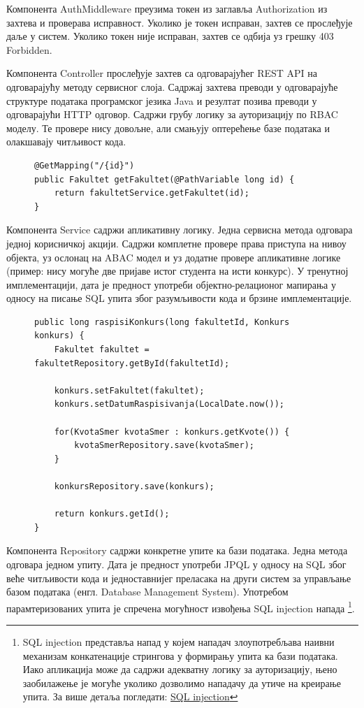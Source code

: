 \documentclass[a4paper]{article}
\begin{document}
Компонента AuthMiddleware преузима токен из заглавља Authorization из захтева и проверава исправност. Уколико је токен 
исправан, захтев се прослеђује даље у систем. Уколико токен није исправан, захтев се одбија уз грешку 403 Forbidden.

Компонента Controller прослеђује захтев са одговарајућег REST API\cite{rest} на одговарајућу методу сервисног слоја. Садржај
захтева преводи у одговарајуће структуре података програмског језика Java и резултат позива преводи у одговарајући HTTP одговор. Садржи грубу логику за ауторизацију по RBAC\cite{rbac} моделу. Те провере нису довољне, али смањују оптерећење базе података и олакшавају читљивост кода.

\begin{figure}[H]
\begin{lstlisting}[caption={Пример Controller методе},label={lst:controller},captionpos=b]
@GetMapping("/{id}")
public Fakultet getFakultet(@PathVariable long id) {
    return fakultetService.getFakultet(id);
}
\end{lstlisting}
\end{figure}

Компонента Service садржи апликативну логику. Једна сервисна метода одговара једној корисничкој акцији. Садржи комплетне
провере права приступа на нивоу објекта, уз ослонац на ABAC\cite{abac} модел и уз додатне провере апликативне логике
(пример: нису могуће две пријаве истог студента на исти конкурс). У тренутној имплементацији, дата је предност употреби
објектно-релационог мапирања у односу на писање SQL упита због разумљивости кода и брзине имплементације.

\begin{figure}[H]
\begin{lstlisting}[caption={Пример Service методе},label={lst:service},captionpos=b]
public long raspisiKonkurs(long fakultetId, Konkurs konkurs) {
    Fakultet fakultet = fakultetRepository.getById(fakultetId);

    konkurs.setFakultet(fakultet);
    konkurs.setDatumRaspisivanja(LocalDate.now());

    for(KvotaSmer kvotaSmer : konkurs.getKvote()) {
        kvotaSmerRepository.save(kvotaSmer);
    }

    konkursRepository.save(konkurs);

    return konkurs.getId();
}
\end{lstlisting}
\end{figure}

Компонента Repository садржи конкретне упите ка бази података. Једна метода одговара једном упиту. Дата је предност
употреби JPQL у односу на SQL због веће читљивости кода и једноставнијег преласака на други систем за управљање базом података (енгл. Database Management System). Употребом парамтеризованих упита је спречена могућност извођења SQL injection напада
\footnote{SQL injection представља напад у којем нападач злоупотребљава наивни механизам конкатенације стрингова у формирању упита ка бази података.
Иако апликација може да садржи адекватну логику за ауторизацију, њено заобилажење је могуће уколико дозволимо нападачу да утиче на креирање упита.
За више детаља погледати: \href{https://portswigger.net/web-security/sql-injection}{SQL injection}}.
\end{document}
